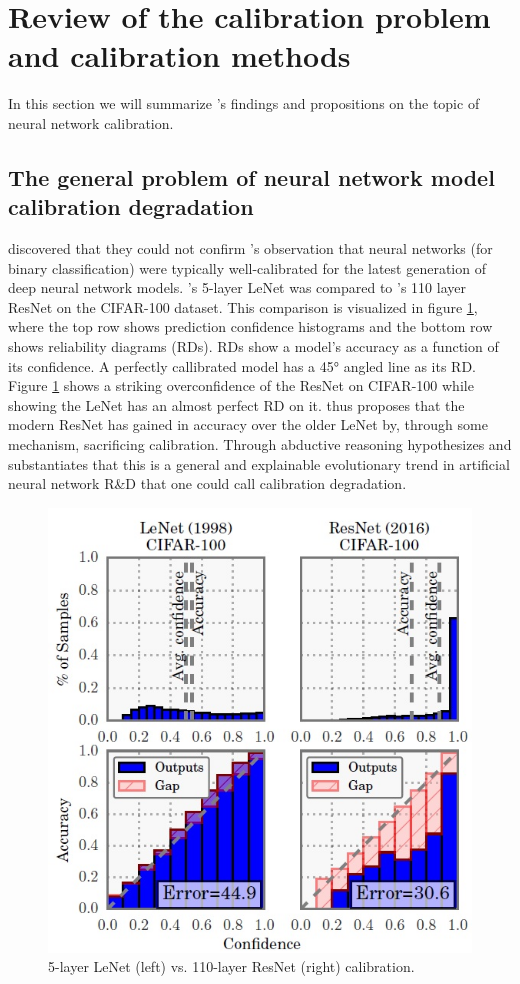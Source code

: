 \section{Review of the calibration problem and calibration methods}
In this section we will summarize \cite{guo2017calibration}'s findings and propositions on the topic of neural network calibration.

\subsection{The general problem of neural network model calibration degradation}
\cite{guo2017calibration} discovered that they could not confirm \cite{niculescu2005predicting}'s observation that neural networks (for binary classification) were typically well-calibrated for the latest generation of deep neural network models. \cite{lecun1998gradient}'s 5-layer LeNet was compared to \cite{he2016deep}'s 110 layer ResNet on the CIFAR-100 dataset. This comparison is visualized in figure \ref{fig:lenet_vs_resnet_calibration_guo_et_al}, where the top row shows prediction confidence histograms and the bottom row shows reliability diagrams (RDs). RDs show a model's accuracy as a function of its confidence. A perfectly callibrated model has a 45° angled line as its RD. Figure \ref{fig:lenet_vs_resnet_calibration_guo_et_al} shows a striking overconfidence of the ResNet on CIFAR-100 while showing the LeNet has an almost perfect RD on it. \cite{guo2017calibration} thus proposes that the modern ResNet has gained in accuracy over the older LeNet by, through some mechanism, sacrificing calibration. Through abductive reasoning \cite{guo2017calibration} hypothesizes and substantiates that this is a general and explainable evolutionary trend in artificial neural network R\&D that one could call calibration degradation. 

\begin{figure}[htbp!]
  \centering
  \includegraphics[width=0.6\linewidth]{images/lenet_vs_resnet_calibration_guo_et_al.jpg}
  \caption[5-layer LeNet's vs. 110-layer ResNet's calibration.]{5-layer LeNet (left) vs. 110-layer ResNet (right) calibration.}
  \label{fig:lenet_vs_resnet_calibration_guo_et_al}
\end{figure}
\newpage


